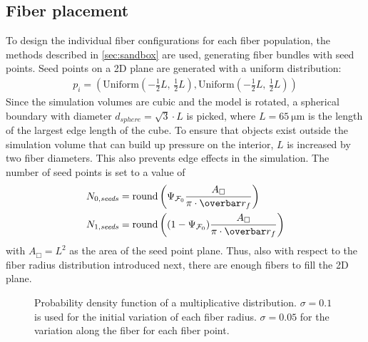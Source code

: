 \subsection{Fiber placement}
%
To design the individual fiber configurations for each fiber population, the methods described in \cref{sec:sandbox} are used, \ie{} generating fiber bundles with seed points.
Seed points on a 2D plane are generated with a uniform distribution:
\begin{align}
p_i = (\mathrm{Uniform}(-\frac{1}{2}\mathit{L}, \, \frac{1}{2}\mathit{L}), \mathrm{Uniform}(-\frac{1}{2}\mathit{L}, \, \frac{1}{2}\mathit{L}))
\end{align}
Since the simulation volumes are cubic and the model is rotated, a spherical boundary with diameter $d_{\mathit{sphere}}=\sqrt{3} \cdot \mathit{L}$ is picked, where $\mathit{L}=\SI{65}{\micro\meter}$ is the length of the largest edge length of the cube.
To ensure that objects exist outside the simulation volume that can build up pressure on the interior, $\mathit{L}$ is increased by two fiber diameters.
This also prevents edge effects in the simulation.
The number of seed points is set to a value of
\begin{align}
N_{0,\mathit{seeds}} &= \round \left(\modelPsi \frac{A_{\Box}}{\pi \cdot \fiberRadiusMean}\right)\\
N_{1,\mathit{seeds}} &= \round \left((1-\modelPsi) \frac{A_{\Box}}{\pi \cdot \fiberRadiusMean}\right)
\end{align}
with $A_{\Box}=L^2$ as the area of the seed point plane.
Thus, also with respect to the fiber radius distribution introduced next, there are enough fibers to fill the 2D plane.
\par
%
\begin{figure}[!t]
\centering
\caption[]{Probability density function of a multiplicative  distribution.
$\sigma=0.1$ is used for the initial variation of each fiber radius.
$\sigma=0.05$ for the variation along the fiber for each fiber point.}
\label{fig:logNormal}
\end{figure}
